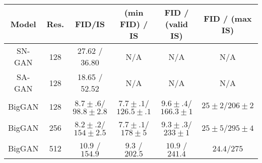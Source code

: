 \begin{table}[tbp]
\small
\begin{center}\begin{tabular}{c|c|c|c|c|c} 
\hline
        Model & Res. &    FID/IS   & (min FID) / IS & FID / (valid IS) & FID / (max IS) \\

\hline SN-GAN & 128 & 27.62 / 36.80 & N/A & N/A & N/A \\

\hline SA-GAN & 128 & 18.65 / 52.52 & N/A & N/A & N/A \\


\hline BigGAN & 128 & $8.7\pm.6$/$98.8\pm2.8$ & $7.7\pm.1$/$126.5\pm.1$  & $9.6\pm.4$/$166.3\pm1$ & $25\pm2/206\pm2$ \\



\hline BigGAN & 256 & $8.2\pm.2$/$154\pm2.5$ & $7.7\pm.1$/$178\pm5$ & $9.3\pm.3$/$233\pm1$ & $25\pm5$/$295\pm4$ \\

\hline BigGAN & 512 & $10.9$ / $154.9$  & $9.3$ / $202.5$  & $10.9$ / $241.4$ & $24.4$/$275$ \\


\end{tabular}
\end{center}
\end{table}
